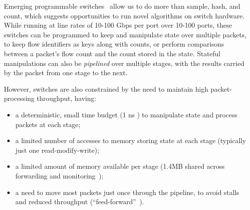 Emerging programmable switches~\cite{RMT,barefoot-tofino,cavium-xpliant} allow
us to do more than sample, hash, and count, which suggests opportunities to run
novel algorithms on switch hardware. While running at line rates of
10-100 Gbps per port over 10-100 ports, these switches can be programmed to keep and
manipulate state over multiple packets, \eg to keep flow identifiers as keys
along with counts, or perform comparisons between a packet's flow count and the
count stored in the state. Stateful manipulations can also be {\em pipelined}
over multiple stages, with the results carried by the packet from one stage to
the next.

However, switches are also constrained by the need to maintain high
packet-processing throughput, having:
\begin{itemize}
\item a deterministic, small time budget (1 ns \cite{RMT}) to manipulate state
  and process packets at each stage;
\item a limited number of accesses to memory storing state at each stage (typically just one read-modify-write);
\item a limited amount of memory available per stage (\eg 1.4MB shared across forwarding and monitoring~\cite{RMT}); 
\item a need to move most packets just once through the pipeline, to
  avoid stalls and reduced throughput
  (``feed-forward''~\cite{minions}).
\end{itemize}


